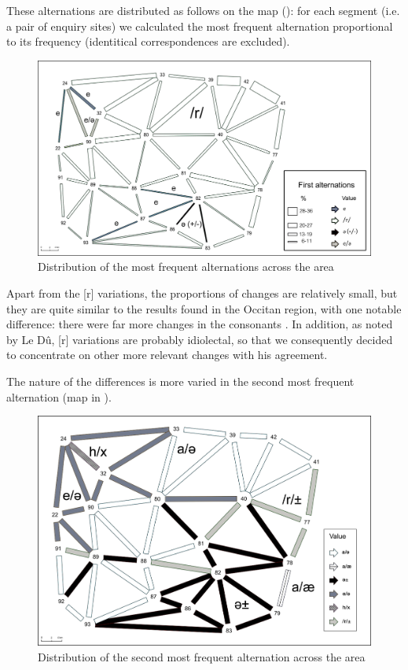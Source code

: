 \documentclass[output=paper]{LSP/langsci}
\begin{document}
\largerpage[-1]
These alternations are distributed as follows on the map (): for each segment (i.e. a pair of enquiry sites) we calculated the most frequent alternation proportional to its frequency (identitical correspondences are excluded).

\begin{figure}
\includegraphics[width=\textwidth]{illustrations/brun_etal_fig4}
\caption{Distribution of the most frequent alternations across the area}
\label{fig:4}
\end{figure}


Apart from the [r] variations, the proportions of changes are relatively small, but they are quite similar to the results found in the Occitan region, with one notable difference: there were far more changes in the consonants \cite[135]{brun-trigaud_usage_2014}. In addition, as noted by Le Dû, [r] variations are probably idiolectal, so that we consequently decided to concentrate on other more relevant changes with his agreement.

The nature of the differences is more varied in the second most frequent alternation (map in ).

\begin{figure}
\includegraphics[width=\textwidth]{illustrations/brun_etal_fig5}
\caption{\textup{Distribution of the second most frequent alternation across the area}}
\label{fig:5}
\end{figure}
\end{document}
